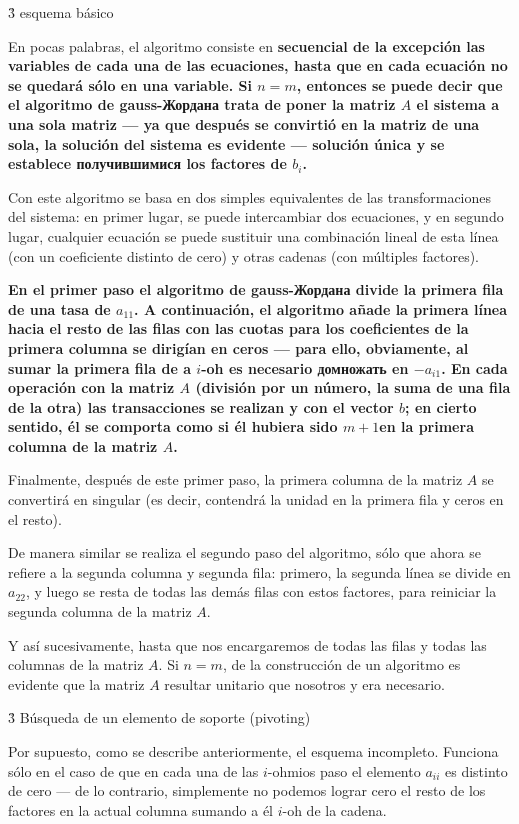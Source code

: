 \h3{ esquema básico }

En pocas palabras, el algoritmo consiste en \bf{secuencial de la excepción} las variables de cada una de las ecuaciones, hasta que en cada ecuación no se quedará sólo en una variable. Si $n=m$, entonces se puede decir que el algoritmo de gauss-Жордана trata de poner la matriz $A$ el sistema a una sola matriz --- ya que después se convirtió en la matriz de una sola, la solución del sistema es evidente --- solución única y se establece получившимися los factores de $b_i$.

Con este algoritmo se basa en dos simples equivalentes de las transformaciones del sistema: en primer lugar, se puede intercambiar dos ecuaciones, y en segundo lugar, cualquier ecuación se puede sustituir una combinación lineal de esta línea (con un coeficiente distinto de cero) y otras cadenas (con múltiples factores).

\bf{En el primer paso} el algoritmo de gauss-Жордана divide la primera fila de una tasa de $a_{11}$. A continuación, el algoritmo añade la primera línea hacia el resto de las filas con las cuotas para los coeficientes de la primera columna se dirigían en ceros --- para ello, obviamente, al sumar la primera fila de a $i$-oh es necesario домножать en $-a_{i1}$. En cada operación con la matriz $A$ (división por un número, la suma de una fila de la otra) las transacciones se realizan y con el vector $b$; en cierto sentido, él se comporta como si él hubiera sido $m+1$en la primera columna de la matriz $A$.

Finalmente, después de este primer paso, la primera columna de la matriz $A$ se convertirá en singular (es decir, contendrá la unidad en la primera fila y ceros en el resto).

De manera similar se realiza el segundo paso del algoritmo, sólo que ahora se refiere a la segunda columna y segunda fila: primero, la segunda línea se divide en $a_{22}$, y luego se resta de todas las demás filas con estos factores, para reiniciar la segunda columna de la matriz $A$.

Y así sucesivamente, hasta que nos encargaremos de todas las filas y todas las columnas de la matriz $A$. Si $n=m$, de la construcción de un algoritmo es evidente que la matriz $A$ resultar unitario que nosotros y era necesario.


\h3{ Búsqueda de un elemento de soporte (pivoting) }

Por supuesto, como se describe anteriormente, el esquema incompleto. Funciona sólo en el caso de que en cada una de las $i$-ohmios paso el elemento $a_{ii}$ es distinto de cero --- de lo contrario, simplemente no podemos lograr cero el resto de los factores en la actual columna sumando a él $i$-oh de la cadena.

